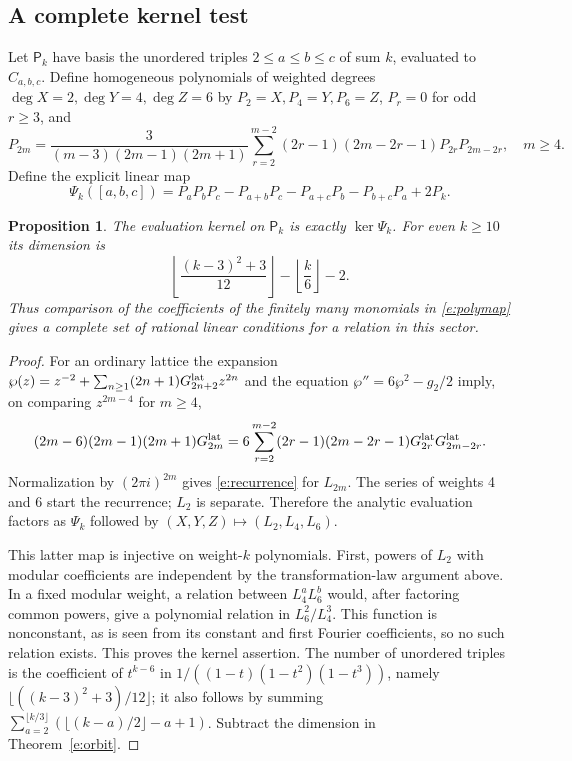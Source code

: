 \documentclass[12pt]{amsart}
\newtheorem{prop}[thm]{Proposition}
\theoremstyle{definition}
\theoremstyle{remark}
\numberwithin{equation}{section}
\numberwithin{equation}{section}
\begin{document}
\subsection{A complete kernel test}\label{e:kernel}
Let $\mathsf P_k$ have basis the unordered triples $2\le a\le b\le c$ of
sum $k$, evaluated to $C_{a,b,c}$. Define homogeneous polynomials of weighted
degrees $\deg X=2,\deg Y=4,\deg Z=6$ by $P_2=X,P_4=Y,P_6=Z$,
$P_r=0$ for odd $r\ge3$, and
\begin{equation}\label{e:recurrence}
 P_{2m}=\frac{3}{(m-3)(2m-1)(2m+1)}
 \sum_{r=2}^{m-2}(2r-1)(2m-2r-1)P_{2r}P_{2m-2r},\quad m\ge4.
\end{equation}
Define the explicit linear map
\begin{equation}\label{e:polymap}
 \Psi_k([a,b,c])=P_aP_bP_c-P_{a+b}P_c-P_{a+c}P_b-P_{b+c}P_a+2P_k.
\end{equation}
\begin{prop}\label{e:kernelprop}
The evaluation kernel on $\mathsf P_k$ is exactly $\ker\Psi_k$.
For even $k\ge10$ its dimension is
\[
 \left\lfloor\frac{(k-3)^2+3}{12}\right\rfloor
       -\left\lfloor\frac{k}{6}\right\rfloor-2.
\]
Thus comparison of the coefficients of the finitely many monomials in
\eqref{e:polymap} gives a complete set of rational linear conditions for a
relation in this sector.
\end{prop}
\begin{proof}
For an ordinary lattice the expansion
$\wp(z)=z^{-2}+\sum_{n\ge1}(2n+1)G^{\rm lat}_{2n+2}z^{2n}$ and the equation
$\wp''=6\wp^2-g_2/2$ imply, on comparing $z^{2m-4}$ for $m\ge4$,
\[
 (2m-6)(2m-1)(2m+1)G^{\rm lat}_{2m}
 =6\sum_{r=2}^{m-2}(2r-1)(2m-2r-1)
           G^{\rm lat}_{2r}G^{\rm lat}_{2m-2r}.
\]
Normalization by $(2\pi i)^{2m}$ gives \eqref{e:recurrence} for $L_{2m}$.
The series of weights 4 and 6 start the recurrence; $L_2$ is separate.
Therefore the analytic evaluation factors as $\Psi_k$ followed by
$(X,Y,Z)\mapsto(L_2,L_4,L_6)$.

This latter map is injective on weight-$k$ polynomials. First, powers of
$L_2$ with modular coefficients are independent by the transformation-law
argument above. In a fixed modular weight, a relation between $L_4^aL_6^b$
would, after factoring common powers, give a polynomial relation in
$L_6^2/L_4^3$. This function is nonconstant, as is seen from its constant and
first Fourier coefficients, so no such relation exists. This proves the
kernel assertion. The number of unordered triples is the coefficient of
$t^{k-6}$ in $1/((1-t)(1-t^2)(1-t^3))$, namely
$\lfloor((k-3)^2+3)/12\rfloor$; it also follows by summing
$\sum_{a=2}^{\lfloor k/3\rfloor}(\lfloor(k-a)/2\rfloor-a+1)$.
Subtract the dimension in Theorem~\ref{e:orbit}.
\end{proof}
\end{document}
